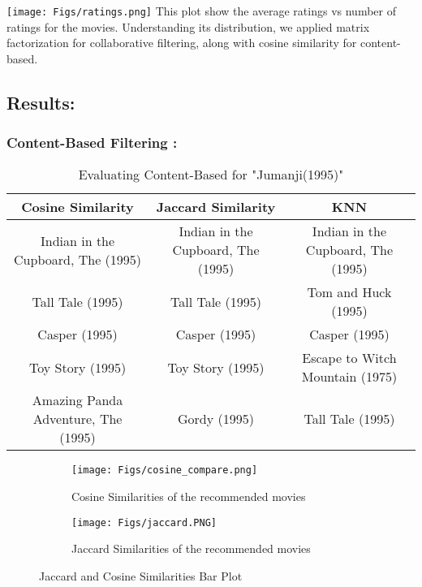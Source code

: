 \documentclass[a4paper]{article}
\theoremstyle{plain}
\theoremstyle{definition}
\begin{document}
 \texttt{[image: Figs/ratings.png]}
This plot show the average ratings vs number of ratings for the movies. Understanding its distribution, we applied matrix factorization for collaborative filtering, along with cosine similarity for content-based.
\newpage
\subsection{\Large \color[RGB]{50,50,50} Results:}
\subsubsection{Content-Based Filtering : }
\begin{table}[htbp]
    \small
    \centering
    \caption{Evaluating Content-Based for "Jumanji(1995)"}
    \begin{tabular}{|c|c|c|}
        \hline
        \textbf{Cosine Similarity} & \textbf{Jaccard Similarity} & \textbf{KNN} \\
        \hline
        Indian in the Cupboard, The (1995) & Indian in the Cupboard, The (1995) & Indian in the Cupboard, The (1995) \\
        Tall Tale (1995) & Tall Tale (1995) & Tom and Huck (1995) \\
        Casper (1995) & Casper (1995) & Casper (1995) \\
        Toy Story (1995) & Toy Story (1995) & Escape to Witch Mountain (1975) \\
        Amazing Panda Adventure, The (1995) & Gordy (1995) & Tall Tale (1995) \\
        \hline
    \end{tabular}
    \label{tab:experiments}
\end{table}

\begin{figure}[htbp]
    \begin{subfigure}{0.5\textwidth}
        \centering
        \texttt{[image: Figs/cosine\_compare.png]}
        \caption{Cosine Similarities of the recommended movies}
    \end{subfigure}%
    \begin{subfigure}{0.6\textwidth}
        \centering
        \texttt{[image: Figs/jaccard.PNG]}
        \caption{Jaccard Similarities of the recommended movies}
    \end{subfigure}
    \caption{Jaccard and Cosine Similarities Bar Plot}
    \label{fig:side_by_side_images}
\end{figure}
\end{document}
